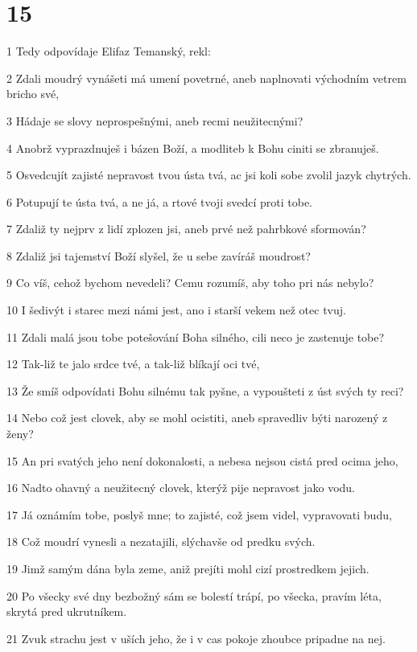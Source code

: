 \chapter{15}

\par 1 Tedy odpovídaje Elifaz Temanský, rekl:
\par 2 Zdali moudrý vynášeti má umení povetrné, aneb naplnovati východním vetrem bricho své,
\par 3 Hádaje se slovy neprospešnými, aneb recmi neužitecnými?
\par 4 Anobrž vyprazdnuješ i bázen Boží, a modliteb k Bohu ciniti se zbranuješ.
\par 5 Osvedcujít zajisté nepravost tvou ústa tvá, ac jsi koli sobe zvolil jazyk chytrých.
\par 6 Potupují te ústa tvá, a ne já, a rtové tvoji svedcí proti tobe.
\par 7 Zdaliž ty nejprv z lidí zplozen jsi, aneb prvé než pahrbkové sformován?
\par 8 Zdaliž jsi tajemství Boží slyšel, že u sebe zavíráš moudrost?
\par 9 Co víš, cehož bychom nevedeli? Cemu rozumíš, aby toho pri nás nebylo?
\par 10 I šedivýt i starec mezi námi jest, ano i starší vekem než otec tvuj.
\par 11 Zdali malá jsou tobe potešování Boha silného, cili neco je zastenuje tobe?
\par 12 Tak-liž te jalo srdce tvé, a tak-liž blíkají oci tvé,
\par 13 Že smíš odpovídati Bohu silnému tak pyšne, a vypoušteti z úst svých ty reci?
\par 14 Nebo což jest clovek, aby se mohl ocistiti, aneb spravedliv býti narozený z ženy?
\par 15 An pri svatých jeho není dokonalosti, a nebesa nejsou cistá pred ocima jeho,
\par 16 Nadto ohavný a neužitecný clovek, kterýž pije nepravost jako vodu.
\par 17 Já oznámím tobe, poslyš mne; to zajisté, což jsem videl, vypravovati budu,
\par 18 Což moudrí vynesli a nezatajili, slýchavše od predku svých.
\par 19 Jimž samým dána byla zeme, aniž prejíti mohl cizí prostredkem jejich.
\par 20 Po všecky své dny bezbožný sám se bolestí trápí, po všecka, pravím léta, skrytá pred ukrutníkem.
\par 21 Zvuk strachu jest v uších jeho, že i v cas pokoje zhoubce pripadne na nej.

